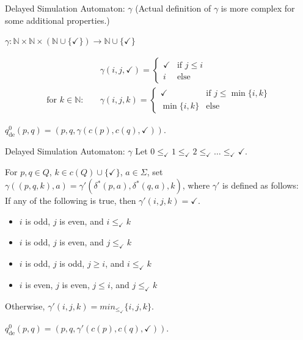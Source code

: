 \begin{frame}{Delayed Simulation Automaton: $\gamma$}
	(Actual definition of $\gamma$ is more complex for some additional properties.) \\
	
	\vspace{.5cm}
	
	$\gamma : \mathbb{N} \times \mathbb{N} \times (\mathbb{N} \cup \{\checkmark\}) \rightarrow \mathbb{N} \cup \{\checkmark\}$
	
	\begin{align*}
		& \gamma(i, j, \checkmark) = \begin{cases}
			\checkmark & \text{if } j \leq i \\
			i & \text{else}
		\end{cases} \\
		\text{for } k \in \mathbb{N}: \quad & \gamma(i, j, k) = \begin{cases}
			\checkmark & \text{if } j \leq \min \{i, k\} \\
			\min \{i, k\} & \text{else}
		\end{cases}
	\end{align*}
	
	\vspace{.5cm}
	
	$q_\text{de}^0(p, q) = (p, q, \gamma(c(p), c(q), \checkmark))$.
\end{frame}


\begin{frame}{Delayed Simulation Automaton: $\gamma$}
	Let $0 \leq_\checkmark 1 \leq_\checkmark 2 \leq_\checkmark \dots \leq_\checkmark \checkmark$.

	For $p, q \in Q$, $k \in c(Q) \cup \{\checkmark\}$, $a \in \Sigma$, set $\gamma((p, q, k), a) = \gamma'(\delta^*(p, a), \delta^*(q, a), k)$, where $\gamma'$ is defined as follows: \\
	If any of the following is true, then $\gamma'(i, j, k) = \checkmark$.
	
	\begin{itemize}
		\item $i$ is odd, $j$ is even, and $i \leq_\checkmark k$
		\item $i$ is odd, $j$ is even, and $j \leq_\checkmark k$
		\item $i$ is odd, $j$ is odd, $j \geq i$, and $i \leq_\checkmark k$
		\item $i$ is even, $j$ is even, $j \leq i$, and $j \leq_\checkmark k$
	\end{itemize}
	
	Otherwise, $\gamma'(i, j, k) = min_{\leq_\checkmark} \{ i,j,k \}$.
	
	$q_\text{de}^0(p, q) = (p, q, \gamma'(c(p), c(q), \checkmark))$.
\end{frame}


